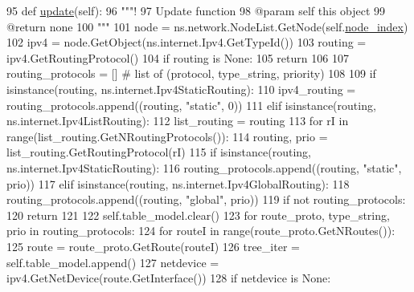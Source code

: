 \begin{DoxyCode}
95     \textcolor{keyword}{def }\hyperlink{classipv4__routing__table_1_1ShowIpv4RoutingTable_aa7e3b727e4337a734ae6e87c40159948}{update}(self):
96         \textcolor{stringliteral}{"""!}
97 \textcolor{stringliteral}{        Update function}
98 \textcolor{stringliteral}{        @param self this object}
99 \textcolor{stringliteral}{        @return none}
100 \textcolor{stringliteral}{        """}
101         node = ns.network.NodeList.GetNode(self.\hyperlink{classipv4__routing__table_1_1ShowIpv4RoutingTable_af135b23094260a6c002cc7d8bb6b479b}{node\_index})
102         ipv4 = node.GetObject(ns.internet.Ipv4.GetTypeId())
103         routing = ipv4.GetRoutingProtocol()
104         \textcolor{keywordflow}{if} routing \textcolor{keywordflow}{is} \textcolor{keywordtype}{None}:
105             \textcolor{keywordflow}{return}
106 
107         routing\_protocols = [] \textcolor{comment}{# list of (protocol, type\_string, priority)}
108 
109         \textcolor{keywordflow}{if} isinstance(routing, ns.internet.Ipv4StaticRouting):
110             ipv4\_routing = routing\_protocols.append((routing, \textcolor{stringliteral}{"static"}, 0))
111         \textcolor{keywordflow}{elif} isinstance(routing, ns.internet.Ipv4ListRouting):
112             list\_routing = routing
113             \textcolor{keywordflow}{for} rI \textcolor{keywordflow}{in} range(list\_routing.GetNRoutingProtocols()):
114                 routing, prio = list\_routing.GetRoutingProtocol(rI)
115                 \textcolor{keywordflow}{if} isinstance(routing, ns.internet.Ipv4StaticRouting):
116                     routing\_protocols.append((routing, \textcolor{stringliteral}{"static"}, prio))
117                 \textcolor{keywordflow}{elif} isinstance(routing, ns.internet.Ipv4GlobalRouting):
118                     routing\_protocols.append((routing, \textcolor{stringliteral}{"global"}, prio))
119         \textcolor{keywordflow}{if} \textcolor{keywordflow}{not} routing\_protocols:
120             \textcolor{keywordflow}{return}
121 
122         self.table\_model.clear()
123         \textcolor{keywordflow}{for} route\_proto, type\_string, prio \textcolor{keywordflow}{in} routing\_protocols:
124             \textcolor{keywordflow}{for} routeI \textcolor{keywordflow}{in} range(route\_proto.GetNRoutes()):
125                 route = route\_proto.GetRoute(routeI)
126                 tree\_iter = self.table\_model.append()
127                 netdevice = ipv4.GetNetDevice(route.GetInterface())
128                 \textcolor{keywordflow}{if} netdevice \textcolor{keywordflow}{is} \textcolor{keywordtype}{None}:

\end{DoxyCode}
